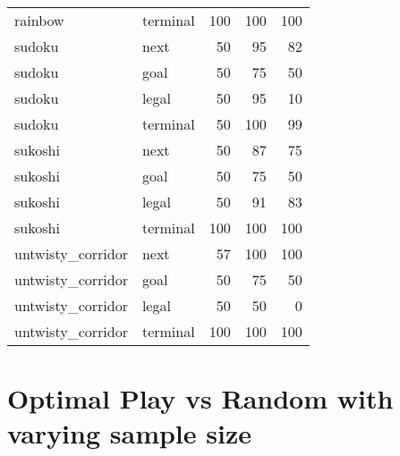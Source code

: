 \documentclass[a4paper,12pt]{report}
\begin{document}
\begin{tabular}{llrrr}
 rainbow            & terminal    &       100 &     100 &                 100 \\
 sudoku             & next        &        50 &      95 &                  82 \\
 sudoku             & goal        &        50 &      75 &                  50 \\
 sudoku             & legal       &        50 &      95 &                  10 \\
 sudoku             & terminal    &        50 &     100 &                  99 \\
 sukoshi            & next        &        50 &      87 &                  75 \\
 sukoshi            & goal        &        50 &      75 &                  50 \\
 sukoshi            & legal       &        50 &      91 &                  83 \\
 sukoshi            & terminal    &       100 &     100 &                 100 \\
 untwisty\_corridor  & next        &        57 &     100 &                 100 \\
 untwisty\_corridor  & goal        &        50 &      75 &                  50 \\
 untwisty\_corridor  & legal       &        50 &      50 &                   0 \\
 untwisty\_corridor  & terminal    &       100 &     100 &                 100 \\
\hline
\end{tabular}


\section{Optimal Play vs Random with varying sample size}


\end{document}

